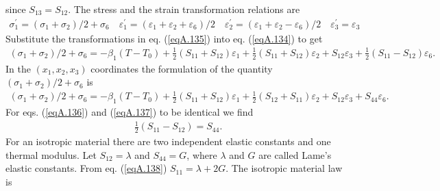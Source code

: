 \documentclass{AeroStructure-ERJohnson}
\begin{document}
since $S_{13}=S_{12}$. The stress and the strain transformation relations are
\begin{align}\label{eqA.135}
\sigma_{1}^{\prime}=(\sigma_{1}+\sigma_{2}) / 2+\sigma_{6} \quad \varepsilon_{1}^{\prime}=\left(\varepsilon_{1}+\varepsilon_{2}+\varepsilon_{6}\right) / 2 \quad \varepsilon_{2}^{\prime}=\left(\varepsilon_{1}+\varepsilon_{2}-\varepsilon_{6}\right) / 2 \quad \varepsilon_{3}^{\prime}=\varepsilon_{3}
\end{align}
Substitute the transformations in eq. (\ref{eqA.135}) into eq. (\ref{eqA.134}) to get
\begin{align}\label{eqA.136}
(\sigma_{1}+\sigma_{2}) / 2+\sigma_{6}=-\beta_{1}(T-T_{0})+\frac{1}{2}(S_{11}+S_{12}) \varepsilon_{1}+\frac{1}{2}(S_{11}+S_{12}) \varepsilon_{2}+S_{12} \varepsilon_{3}+\frac{1}{2}(S_{11}-S_{12}) \varepsilon_{6}.
\end{align}
In the $(x_{1}, x_{2}, x_{3})$ coordinates the formulation of the quantity $(\sigma_{1}+\sigma_{2}) / 2+\sigma_{6}$ is
\begin{align}\label{eqA.137}
(\sigma_{1}+\sigma_{2}) / 2+\sigma_{6}=-\beta_{1}(T-T_{0})+\frac{1}{2}(S_{11}+S_{12}) \varepsilon_{1}+\frac{1}{2}(S_{12}+S_{11}) \varepsilon_{2}+S_{12} \varepsilon_{3}+S_{44} \varepsilon_{6}.
\end{align}
For eqs. (\ref{eqA.136}) and (\ref{eqA.137}) to be identical we find
\begin{align}\label{eqA.138}
\frac{1}{2}(S_{11}-S_{12})=S_{44}.
\end{align}
For an isotropic material there are two independent elastic constants and one thermal modulus. Let $S_{12}=\lambda$ and $S_{44}=G$, where $\lambda$ and $G$ are called Lame’s elastic constants. From eq. (\ref{eqA.138}) $S_{11}=\lambda+2 G$. The isotropic material law is
\end{document}
